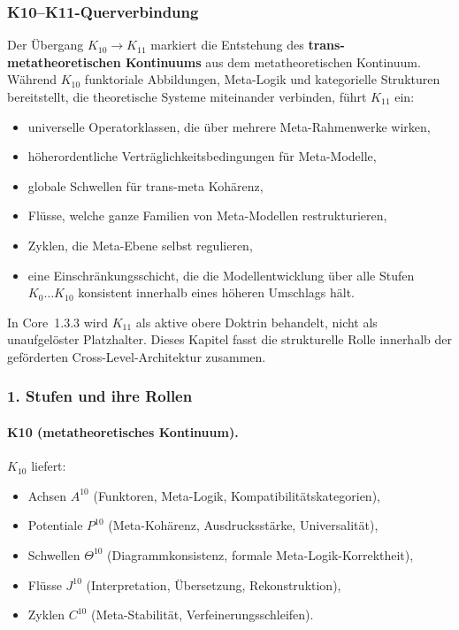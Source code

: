 
\subsubsection{K10–K11-Querverbindung}
\label{sec:crossk-k10-k11}

Der Übergang $K_{10} \rightarrow K_{11}$ markiert die Entstehung des
\textbf{trans-metatheoretischen Kontinuums} aus dem metatheoretischen
Kontinuum. Während $K_{10}$ funktoriale Abbildungen, Meta-Logik und
kategorielle Strukturen bereitstellt, die theoretische Systeme miteinander verbinden,
führt $K_{11}$ ein:
\begin{itemize}
  \item universelle Operatorklassen, die über mehrere Meta-Rahmenwerke wirken,
  \item höherordentliche Verträglichkeitsbedingungen für Meta-Modelle,
  \item globale Schwellen für trans-meta Kohärenz,
  \item Flüsse, welche ganze Familien von Meta-Modellen restrukturieren,
  \item Zyklen, die Meta-Ebene selbst regulieren,
  \item eine Einschränkungsschicht, die die Modellentwicklung über alle Stufen
        $K_0\dots K_{10}$ konsistent innerhalb eines höheren Umschlags hält.
\end{itemize}

In Core~1.3.3 wird $K_{11}$ als aktive obere Doktrin behandelt, nicht als
unaufgelöster Platzhalter. Dieses Kapitel fasst die strukturelle Rolle innerhalb
der geförderten Cross-Level-Architektur zusammen.

\subsubsection{1. Stufen und ihre Rollen}

\paragraph{K10 (metatheoretisches Kontinuum).}
$K_{10}$ liefert:
\begin{itemize}
  \item Achsen $A^{10}$ (Funktoren, Meta-Logik, Kompatibilitätskategorien),
  \item Potentiale $P^{10}$ (Meta-Kohärenz, Ausdrucksstärke, Universalität),
  \item Schwellen $\Theta^{10}$ (Diagrammkonsistenz,
        formale Meta-Logik-Korrektheit),
  \item Flüsse $J^{10}$ (Interpretation, Übersetzung, Rekonstruktion),
  \item Zyklen $C^{10}$ (Meta-Stabilität, Verfeinerungsschleifen).
\end{itemize}

